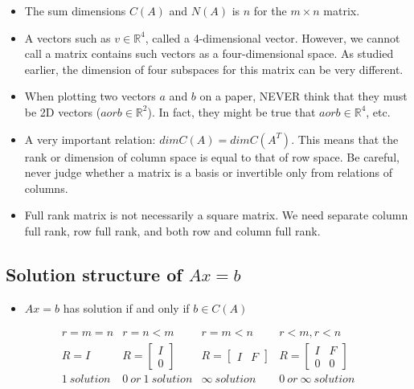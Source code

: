 \documentclass[11pt]{article}
\providecommand{\tightlist}{%
      \setlength{\itemsep}{0pt}\setlength{\parskip}{0pt}}
\def\lt{<}
\begin{document}
\begin{itemize}
\begin{enumerate}
  \end{enumerate}
\item
  The sum dimensions \(C(A)\) and \(N(A)\) is \(n\) for the
  \(m\times n\) matrix.
\item
  A vectors such as \(v\in\mathbb{R}^4\), called a 4-dimensional vector.
  However, we cannot call a matrix contains such vectors as a
  four-dimensional space. As studied earlier, the dimension of four
  subspaces for this matrix can be very different.\\
\item
  When plotting two vectors \(a\) and \(b\) on a paper, NEVER think that
  they must be 2D vectors (\(a or b \in \mathbb{R}^2\)). In fact, they
  might be true that \(a or b \in \mathbb{R}^4\), etc.
\item
  A very important relation: \(dim C(A) = dim C(A^T)\). This means that
  the rank or dimension of column space is equal to that of row space.
  Be careful, never judge whether a matrix is a basis or invertible only
  from relations of columns.
\item
  Full rank matrix is not necessarily a square matrix. We need separate
  column full rank, row full rank, and both row and column full rank.
\end{itemize}

\subsection{\texorpdfstring{Solution structure of
\(Ax = b\)}{Solution structure of Ax = b}}\label{solution-structure-of-ax-b}

\begin{itemize}
\tightlist
\item
  \(Ax = b\) has solution if and only if \(b\in C(A)\)
\end{itemize}

\[\begin{array}{c|c|c|c}r=m=n&r=n\lt m&r=m\lt n&r\lt m,r\lt n\\R=I&R=\begin{bmatrix}I\\0\end{bmatrix}&R=\begin{bmatrix}I&F\end{bmatrix}&R=\begin{bmatrix}I&F\\0&0\end{bmatrix}\\1\ solution&0\ or\ 1\ solution&\infty\ solution&0\ or\ \infty\ solution\end{array}\]
\end{document}
